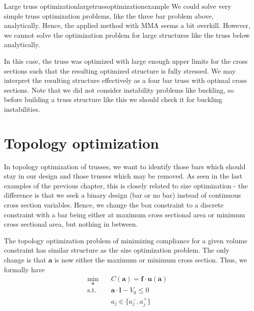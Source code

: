 \begin{example}{Large truss optimization}{largetrussoptimizationexample} 
    We could solve very simple truss optimization problems, like the three bar problem above, analytically. Hence, the applied method with MMA seems a bit overkill. 
    However, we cannot solve the optimization problem for large structures like the truss below analytically. 

    \begin{center}
         
    \end{center}

    In this case, the truss was optimized with large enough upper limits for the cross sections such that the resulting optimized structure is fully stressed. We may interpret the resulting structure effectively as a four bar truss with optimal cross sections. Note that we did not consider instability problems like buckling, so before building a truss structure like this we should check it for buckling instabilities.

    \begin{center}
         
    \end{center}
\end{example}

\section{Topology optimization}
\label{sec:truss_topology}
In topology optimization of trusses, we want to identify those bars which should stay in our design and those trusses which may be removed. As seen in the last examples of the previous chapter, this is closely related to size optimization - the difference is that we seek a binary design (bar or no bar) instead of continuous cross section variables. Hence, we change the box constraint to a discrete constraint with a bar being either at maximum cross sectional area or minimum cross sectional area, but nothing in between.

The topology optimization problem of minimizing compliance for a given volume constraint has similar structure as the size optimization problem. The only change is that $\mathbf{a}$ is now either the maximum or minimum cross section. Thus, we formally have 
\begin{equation}
    \begin{aligned}
        \min_{\mathbf{a}} \quad & C(\mathbf{a}) = \mathbf{f} \cdot \mathbf{u}(\mathbf{a})\\
        \textrm{s.t.} \quad & \mathbf{a} \cdot \mathbf{l} - V_0 \le 0  \\
                            & a_j \in \{a_j^-, a_j^+\}\\
    \end{aligned}
\end{equation}

